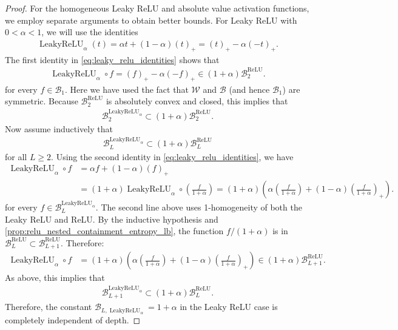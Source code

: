 \documentclass{article}
\DeclareMathOperator{\ReLU}{\mathrm{ReLU}}
\DeclareMathOperator{\LeakyReLU}{\mathrm{LeakyReLU}}
\def\cB{{\mathcal{B}}}
\def\cW{{\mathcal{W}}}
\begin{document}
\begin{appendices}
\begin{proof}
    For the homogeneous Leaky ReLU and absolute value activation functions, we employ separate arguments to obtain better bounds. For Leaky ReLU with $0 < \alpha < 1$, we will use the identities
    \begin{align} \label{eq:leaky_relu_identities}
        \LeakyReLU_\alpha(t) = \alpha t + (1-\alpha)(t)_+ = (t)_+ - \alpha(-t)_+.
    \end{align}
    The first identity in \eqref{eq:leaky_relu_identities} shows that
    \begin{align}
        \LeakyReLU_\alpha \circ f = (f)_+ - \alpha(-f)_+ \in (1+\alpha) \cB_{2}^{\ReLU}.
    \end{align}
    for every $f \in \cB_1$. Here we have used the fact that $\cW$ and $\cB$ (and hence $\cB_1$) are symmetric. Because $\cB_2^{\ReLU}$ is absolutely convex and closed, this implies that
    \begin{align}
        \cB_2^{\LeakyReLU_\alpha} \subset (1+\alpha) \cB_2^{\ReLU}.
    \end{align}
    Now assume inductively that
    \begin{align}
        \cB_L^{\LeakyReLU_\alpha} \subset (1+\alpha) \cB_L^{\ReLU}
    \end{align}
    for all $L \geq 2$. Using the second identity in \eqref{eq:leaky_relu_identities}, we have
    \begin{align}
        \LeakyReLU_\alpha \circ f &= \alpha f + (1-\alpha) (f)_+ \\
        & = (1+\alpha) \LeakyReLU_\alpha \circ \left( \frac{f}{1+\alpha} \right) = (1+\alpha) \left( \alpha \left( \frac{f}{1+\alpha} \right) + (1-\alpha) \left( \frac{f}{1+\alpha}  \right)_+ \right).
    \end{align}
    for every $f \in \cB_L^{\LeakyReLU_\alpha}$. The second line above uses 1-homogeneity of both the Leaky ReLU and ReLU. By the inductive hypothesis and \cref{prop:relu_nested_containment_entropy_lb}, the function $f/(1+\alpha)$ is in $\cB_L^{\ReLU} \subset \cB_{L+1}^{\ReLU}$. Therefore:
    \begin{align}
         \LeakyReLU_\alpha \circ f &= (1+\alpha) \left( \alpha \left( \frac{f}{1+\alpha} \right) + (1-\alpha) \left( \frac{f}{1+\alpha}  \right)_+ \right) \in (1+\alpha) \cB_{L+1}^{\ReLU}. 
    \end{align}
    As above, this implies that
    \begin{align}
        \cB_{L+1}^{\LeakyReLU_\alpha} \subset (1+\alpha) \cB_L^{\ReLU}.
    \end{align}
    Therefore, the constant $\cB_{L, \LeakyReLU_\alpha} = 1+\alpha$ in the Leaky ReLU case is completely independent of depth.


\end{proof}
\end{appendices}
\end{document}
